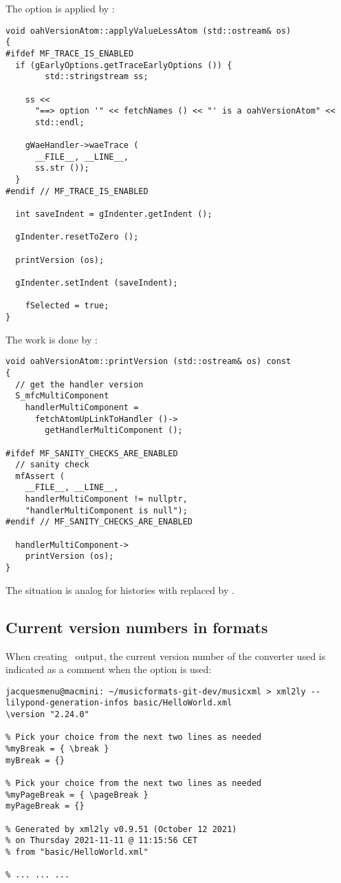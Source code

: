 The option is applied by :
\begin{lstlisting}[language=CPlusPlus]
void oahVersionAtom::applyValueLessAtom (std::ostream& os)
{
#ifdef MF_TRACE_IS_ENABLED
  if (gEarlyOptions.getTraceEarlyOptions ()) {
		std::stringstream ss;

    ss <<
      "==> option '" << fetchNames () << "' is a oahVersionAtom" <<
      std::endl;

    gWaeHandler->waeTrace (
      __FILE__, __LINE__,
      ss.str ());
  }
#endif // MF_TRACE_IS_ENABLED

  int saveIndent = gIndenter.getIndent ();

  gIndenter.resetToZero ();

  printVersion (os);

  gIndenter.setIndent (saveIndent);

	fSelected = true;
}
\end{lstlisting}

The work is done by :
\begin{lstlisting}[language=CPlusPlus]
void oahVersionAtom::printVersion (std::ostream& os) const
{
  // get the handler version
  S_mfcMultiComponent
    handlerMultiComponent =
      fetchAtomUpLinkToHandler ()->
        getHandlerMultiComponent ();

#ifdef MF_SANITY_CHECKS_ARE_ENABLED
  // sanity check
  mfAssert (
    __FILE__, __LINE__,
    handlerMultiComponent != nullptr,
    "handlerMultiComponent is null");
#endif // MF_SANITY_CHECKS_ARE_ENABLED

  handlerMultiComponent->
    printVersion (os);
}
\end{lstlisting}

The situation is analog for histories with  replaced by .


\subsection{Current version numbers in formats}\label{Current version numbers in formats}

When creating \lily\ output, the current version number of the converter used is indicated as a comment when the  option is used:
\begin{lstlisting}[language=Terminal]
jacquesmenu@macmini: ~/musicformats-git-dev/musicxml > xml2ly --lilypond-generation-infos basic/HelloWorld.xml
\version "2.24.0"

% Pick your choice from the next two lines as needed
%myBreak = { \break }
myBreak = {}

% Pick your choice from the next two lines as needed
%myPageBreak = { \pageBreak }
myPageBreak = {}

% Generated by xml2ly v0.9.51 (October 12 2021)
% on Thursday 2021-11-11 @ 11:15:56 CET
% from "basic/HelloWorld.xml"

% ... ... ...
\end{lstlisting}

